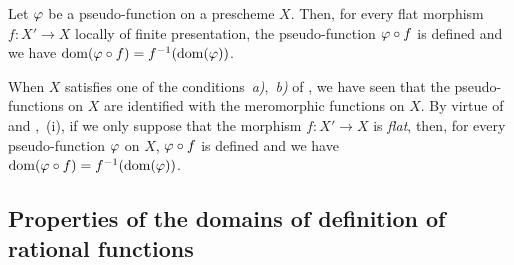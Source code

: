 \begin{corollary}[20.3.12]
\label{IV.20.3.12}
Let $\varphi$ be a pseudo-function on a prescheme $X$.
Then, for every flat morphism $f:X'\to X$ locally of finite presentation, the pseudo-function $\varphi\circ f$ is defined and we have $\operatorname{dom}(\varphi\circ f)=f^{-1}(\operatorname{dom}(\varphi))$.
\end{corollary}

\begin{remark}[20.3.13]
\label{IV.20.3.13}
When $X$ satisfies one of the conditions~\emph{a)},~\emph{b)} of , we have seen  that the pseudo-functions on $X$ are identified with the meromorphic functions on $X$.
By virtue of  and ,~(i), if we only suppose that the morphism $f:X'\to X$ is \emph{flat}, then, for every pseudo-function $\varphi$ on $X$, $\varphi\circ f$ is defined and we have $\operatorname{dom}(\varphi\circ f)=f^{-1}(\operatorname{dom}(\varphi))$.
\end{remark}


\subsection{Properties of the domains of definition of rational functions}

